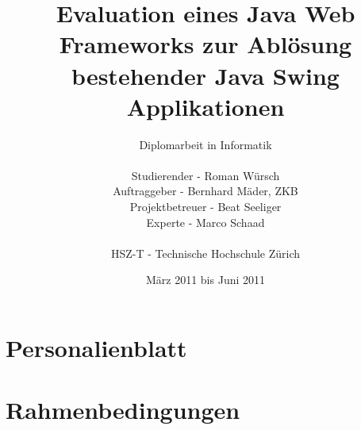 \documentclass[
11pt, %
a4paper, %
BCOR25mm, %
DIV14, %
footsepline = false, %
headsepline, %
twoside, %
openright,
abstracton, %
listof=totocnumbered, %
bibliography=totocnumbered %
]{scrreprt}
\title{Evaluation eines Java Web Frameworks zur Ablösung bestehender Java Swing
Applikationen}
\author{Diplomarbeit in Informatik\\
    \\
    Studierender - Roman Würsch\\
	Auftraggeber - Bernhard Mäder, ZKB\\
    Projektbetreuer - Beat Seeliger\\
    Experte - Marco Schaad\\
	\\
	HSZ-T - Technische Hochschule Zürich}
\date{März 2011 bis Juni 2011}
\begin{document}
  \ifpdf
  \else
  \fi
  
  
  \maketitle
  
  \cleardoublepage
  
  
  
  
  
  \cleardoublepage
  

  
  \tableofcontents
  
  \cleardoublepage
  
  
  
  \chapter{Personalienblatt}\label{chapter:Personalienblatt}

  
  
      
  
  \chapter{Rahmenbedingungen}\label{chapter:Rahmenbedingungen}
  
\end{document}
